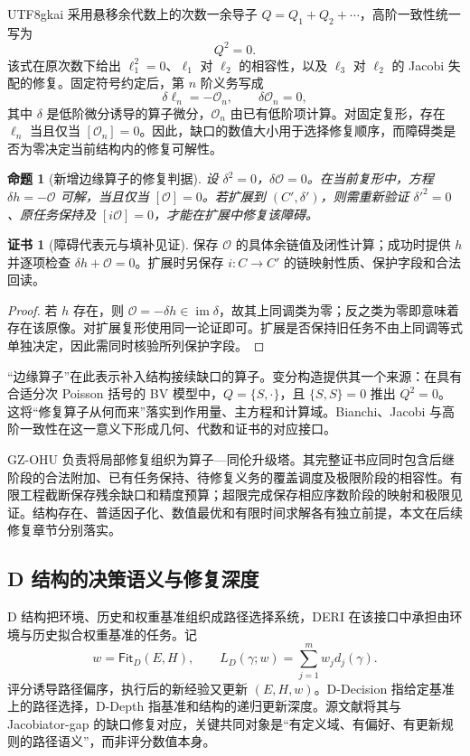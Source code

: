 \documentclass[11pt,a4paper]{article}
\theoremstyle{plain}
\newtheorem{proposition}[theorem]{命题}
\theoremstyle{definition}
\newtheorem*{certificate}{证书}
\theoremstyle{remark}
\begin{document}
\begin{CJK*}{UTF8}{gkai}
采用悬移余代数上的次数一余导子 $Q=Q_1+Q_2+\cdots$，高阶一致性统一写为
\[
 Q^2=0.
\]
该式在原次数下给出 $\ell_1^2=0$、$\ell_1$ 对 $\ell_2$ 的相容性，以及 $\ell_3$ 对 $\ell_2$ 的 Jacobi 失配的修复。固定符号约定后，第 $n$ 阶义务写成
\[
 \delta \ell_n=-\mathcal O_n,\qquad \delta\mathcal O_n=0,
\]
其中 $\delta$ 是低阶微分诱导的算子微分，$\mathcal O_n$ 由已有低阶项计算。对固定复形，存在 $\ell_n$ 当且仅当 $[\mathcal O_n]=0$。因此，缺口的数值大小用于选择修复顺序，而障碍类是否为零决定当前结构内的修复可解性。\cite{S07,S08,S09}

\begin{proposition}[新增边缘算子的修复判据]
\label{fa:prop-edge}
设 $\delta^2=0$，$\delta\mathcal O=0$。在当前复形中，方程 $\delta h=-\mathcal O$ 可解，当且仅当 $[\mathcal O]=0$。若扩展到 $(C',\delta')$，则需重新验证 $\delta'^2=0$、原任务保持及 $[i\mathcal O]=0$，才能在扩展中修复该障碍。
\end{proposition}
\begin{certificate}[障碍代表元与填补见证]
保存 $\mathcal O$ 的具体余链值及闭性计算；成功时提供 $h$ 并逐项检查 $\delta h+\mathcal O=0$。扩展时另保存 $i:C\to C'$ 的链映射性质、保护字段和合法回读。
\end{certificate}
\begin{proof}
若 $h$ 存在，则 $\mathcal O=-\delta h\in\operatorname{im}\delta$，故其上同调类为零；反之类为零即意味着存在该原像。对扩展复形使用同一论证即可。扩展是否保持旧任务不由上同调等式单独决定，因此需同时核验所列保护字段。
\end{proof}

“边缘算子”在此表示补入结构接续缺口的算子。变分构造提供其一个来源：在具有合适分次 Poisson 括号的 BV 模型中，$Q=\{S,\cdot\}$，且 $\{S,S\}=0$ 推出 $Q^2=0$。这将“修复算子从何而来”落实到作用量、主方程和计算域。Bianchi、Jacobi 与高阶一致性在这一意义下形成几何、代数和证书的对应接口。\cite{S08,S09}

GZ-OHU 负责将局部修复组织为算子—同伦升级塔。其完整证书应同时包含后继阶段的合法附加、已有任务保持、待修复义务的覆盖调度及极限阶段的相容性。有限工程截断保存残余缺口和精度预算；超限完成保存相应序数阶段的映射和极限见证。结构存在、普适因子化、数值最优和有限时间求解各有独立前提，本文在后续修复章节分别落实。

\subsection{D 结构的决策语义与修复深度}

D 结构把环境、历史和权重基准组织成路径选择系统，DERI 在该接口中承担由环境与历史拟合权重基准的任务。记
\[
 w=\mathsf{Fit}_D(E,H),\qquad
 L_D(\gamma;w)=\sum_{j=1}^{m}w_jd_j(\gamma).
\]
评分诱导路径偏序，执行后的新经验又更新 $(E,H,w)$。D-Decision 指给定基准上的路径选择，D-Depth 指基准和结构的递归更新深度。源文献将其与 Jacobiator-gap 的缺口修复对应，关键共同对象是“有定义域、有偏好、有更新规则的路径语义”，而非评分数值本身。\cite{S05,S06}


\end{CJK*}
\end{document}

